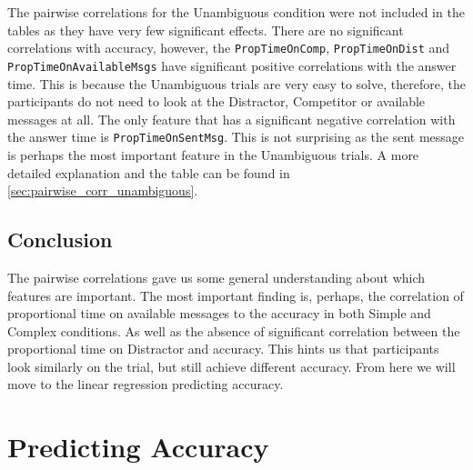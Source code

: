 \sloppy
The pairwise correlations for the Unambiguous condition were not included in the tables as they have very few significant effects. There are no significant correlations with accuracy, however, the \texttt{PropTimeOnComp}, \texttt{PropTimeOnDist} and \texttt{PropTimeOnAvailableMsgs} have significant positive correlations with the answer time. This is because the Unambiguous trials are very easy to solve, therefore, the participants do not need to look at the Distractor, Competitor or available messages at all. The only feature that has a significant negative correlation with the answer time is \texttt{PropTimeOnSentMsg}. This is not surprising as the sent message is perhaps the most important feature in the Unambiguous trials. A more detailed explanation and the table can be found in \autoref{sec:pairwise_corr_unambiguous}.
\sloppy

\subsection*{Conclusion}
The pairwise correlations gave us some general understanding about which features are important. The most important finding is, perhaps, the correlation of proportional time on available messages to the accuracy in both Simple and Complex conditions. As well as the absence of significant correlation between the proportional time on Distractor and accuracy. This hints us that participants look similarly on the trial, but still achieve different accuracy. From here we will move to the linear regression predicting accuracy. 















\section{Predicting Accuracy}
\label{sec:accuracy_model}

